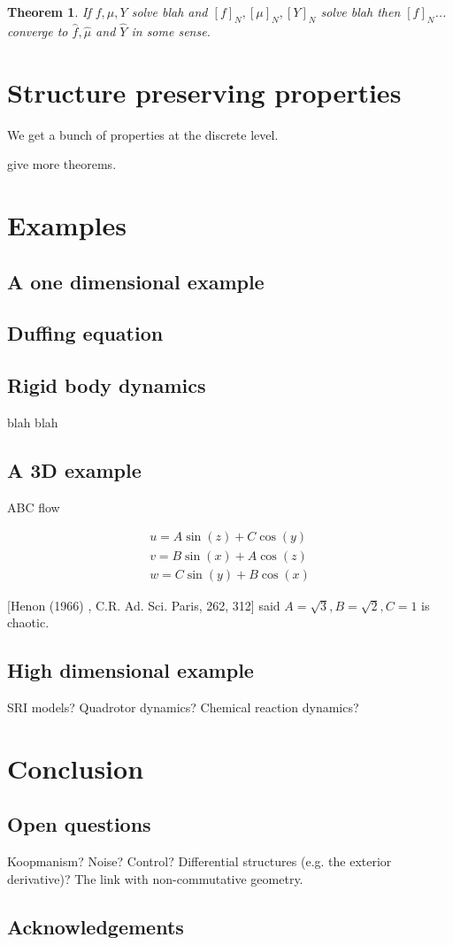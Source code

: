 \documentclass[12pt]{amsart}
\newtheorem{thm}{Theorem}[section]
\begin{document}
\begin{thm}
	If $f,\mu,Y$ solve blah and $[f]_N,[\mu]_N, [Y]_N$ solve blah
	then $[f]_N$... converge to $\hat{f},\hat{\mu}$ and $\widehat{Y}$ in some sense.
\end{thm}

\section{Structure preserving properties}
\label{sec:structure}
We get a bunch of properties at the discrete level.


give more theorems.

\section{Examples}

\subsection{A one dimensional example}

\subsection{Duffing equation}

\subsection{Rigid body dynamics}
blah blah

\subsection{A 3D example}
ABC flow

\begin{align*}
	u = A \sin(z) + C \cos(y) \\
	v = B \sin(x) + A \cos(z) \\
	w = C \sin(y) + B \cos(x)
\end{align*}

[Henon (1966) , C.R. Ad. Sci. Paris, 262, 312]
said $A = \sqrt{3},B = \sqrt{2},C=1$ is chaotic.

\subsection{High dimensional example}
SRI models?  Quadrotor dynamics?  Chemical reaction dynamics?

\section{Conclusion}

\subsection{Open questions}
Koopmanism?  Noise?  Control?  Differential structures (e.g. the exterior derivative)?  The link with non-commutative geometry.

\subsection{Acknowledgements}



\end{document}
